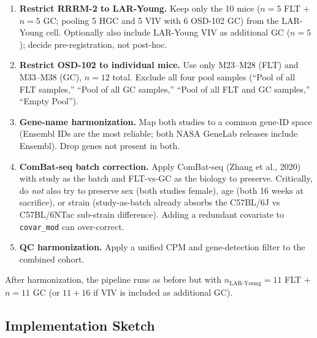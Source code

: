 \documentclass[11pt]{article}
\newcommand{\code}[1]{\texttt{#1}}
\begin{document}
\begin{enumerate}[leftmargin=*]
\item \textbf{Restrict RRRM-2 to LAR-Young.} Keep only the 10 mice ($n{=}5$ FLT $+$ $n{=}5$ GC; pooling 5 HGC and 5 VIV with 6 OSD-102 GC) from the LAR-Young cell. Optionally also include LAR-Young VIV as additional GC ($n{=}5$); decide pre-registration, not post-hoc.
\item \textbf{Restrict OSD-102 to individual mice.} Use only M23--M28 (FLT) and M33--M38 (GC), $n{=}12$ total. Exclude all four pool samples (``Pool of all FLT samples,'' ``Pool of all GC samples,'' ``Pool of all FLT and GC samples,'' ``Empty Pool'').
\item \textbf{Gene-name harmonization.} Map both studies to a common gene-ID space (Ensembl IDs are the most reliable; both NASA GeneLab releases include Ensembl). Drop genes not present in both.
\item \textbf{ComBat-seq batch correction.} Apply ComBat-seq (Zhang et al., 2020) with study as the batch and FLT-vs-GC as the biology to preserve. Critically, do \emph{not} also try to preserve sex (both studies female), age (both 16 weeks at sacrifice), or strain (study-as-batch already absorbs the C57BL/6J vs C57BL/6NTac sub-strain difference). Adding a redundant covariate to \code{covar\_mod} can over-correct.
\item \textbf{QC harmonization.} Apply a unified CPM and gene-detection filter to the combined cohort.
\end{enumerate}

After harmonization, the pipeline runs as before but with $n_{\text{LAR-Young}}{=}11$ FLT $+$ $n{=}11$ GC (or $11{+}16$ if VIV is included as additional GC).

\subsection{Implementation Sketch}
\end{document}
